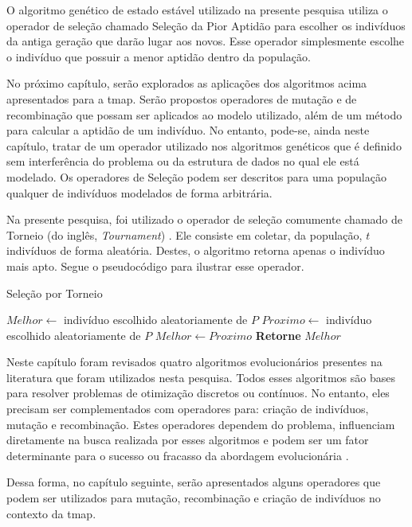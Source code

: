 O algoritmo genético de estado estável utilizado na presente pesquisa utiliza 
o operador de seleção chamado Seleção da Pior Aptidão 
\citep{Luke2013Metaheuristics} para escolher os indivíduos da antiga geração 
que darão lugar aos novos. Esse operador simplesmente escolhe o indivíduo que 
possuir a menor aptidão dentro da população.

No próximo capítulo, serão explorados as aplicações dos algoritmos acima 
apresentados para a \ac{tmap}. Serão propostos operadores de mutação e de 
recombinação que possam ser aplicados ao modelo utilizado, além de um método 
para calcular a aptidão de um indivíduo. No entanto, pode-se, ainda neste 
capítulo, tratar de um operador utilizado nos algoritmos genéticos que é 
definido sem interferência do problema ou da estrutura de dados no qual ele 
está modelado. Os operadores de Seleção podem ser descritos para uma população 
qualquer de indivíduos modelados de forma arbitrária.

Na presente pesquisa, foi utilizado o operador de seleção comumente chamado de 
Torneio (do inglês, \textit{Tournament}) \citep{Luke2013Metaheuristics}. Ele 
consiste em coletar, da população, $t$ indivíduos de forma aleatória. Destes, 
o algoritmo retorna apenas o indivíduo mais apto. Segue o pseudocódigo para 
ilustrar esse operador.

\begin{algorithm}[h]                      %
	\caption{Seleção por Torneio}          %
	\label{torneio}                           %
	\begin{algorithmic}                    %
		\State $Melhor \gets $ indivíduo escolhido aleatoriamente de $P$ 
			\State $Proximo \gets $ indivíduo escolhido aleatoriamente de $P$
				\State $Melhor \gets Proximo$
			\EndIf
		\EndFor
		\State \textbf{Retorne} $Melhor$
		\EndProcedure
	\end{algorithmic}
\end{algorithm}

Neste capítulo foram revisados quatro algoritmos evolucionários presentes na 
literatura que foram utilizados nesta pesquisa. Todos esses algoritmos são bases 
para resolver problemas de otimização discretos ou contínuos. No entanto, eles 
precisam ser complementados com operadores para: criação de indivíduos, mutação 
e recombinação. Estes operadores dependem do problema, influenciam diretamente 
na busca realizada por esses algoritmos e podem ser um fator determinante para o 
sucesso ou fracasso da abordagem evolucionária \citep{Luke2013Metaheuristics}.

Dessa forma, no capítulo seguinte, serão apresentados alguns operadores que 
podem ser utilizados para mutação, recombinação e criação de indivíduos no 
contexto da \ac{tmap}.